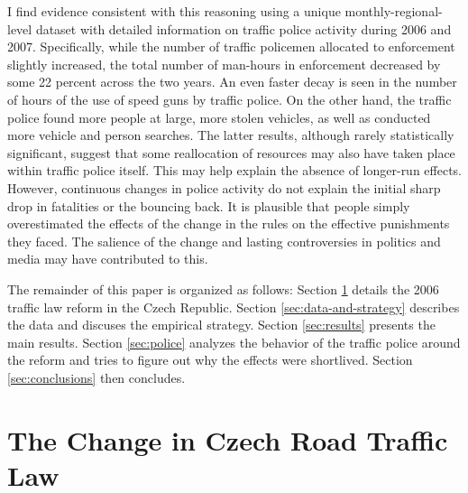 \documentclass[12pt]{article}
\begin{document}
I find evidence consistent with this reasoning using a unique
monthly-regional-level dataset with detailed information on traffic police
activity during 2006 and 2007.  Specifically, while the number of traffic
policemen allocated to enforcement slightly increased, the total number of
man-hours in enforcement decreased by some 22 percent across the two years.  An
even faster decay is seen in the number of hours of the use of speed guns by
traffic police. On the other hand, the traffic police found more people at
large, more stolen vehicles, as well as conducted more vehicle and person
searches. The latter results, although rarely statistically significant, suggest
that some reallocation of resources may also have taken place within traffic
police itself. This may help explain the absence of longer-run effects.
However, continuous changes in police activity do not explain the initial sharp
drop in fatalities or the bouncing back. It is plausible that people simply
overestimated the effects of the change in the rules on the effective
punishments they faced. The salience of the change and lasting controversies in
politics and media may have contributed to this.

The remainder of this paper is organized as follows:  Section
\ref{sec:the-new-law} details the 2006 traffic law reform in the Czech Republic.
Section \ref{sec:data-and-strategy} describes the data and discuses the
empirical strategy.  Section \ref{sec:results} presents the main results.
Section \ref{sec:police} analyzes the behavior of the traffic police around the
reform and tries to figure out why the effects were shortlived.  Section
\ref{sec:conclusions} then concludes.

\section{The Change in Czech Road Traffic Law} %
\label{sec:the-new-law}
\end{document}
